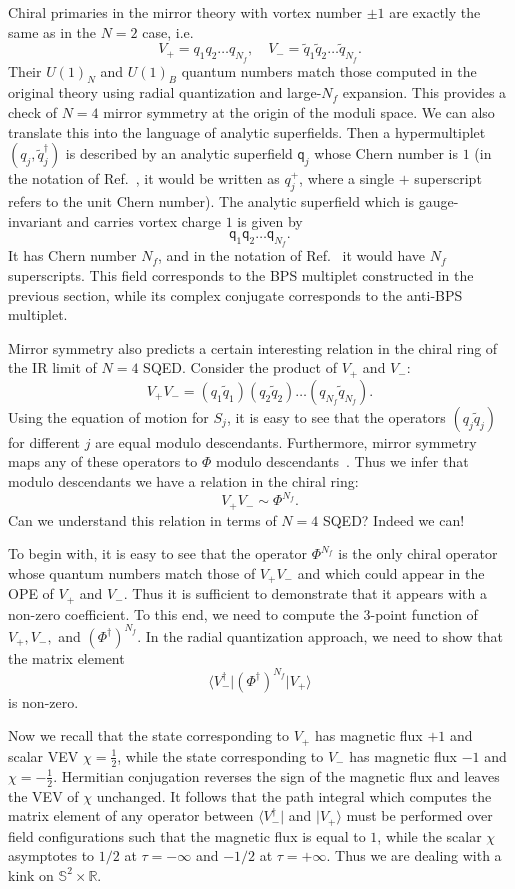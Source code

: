 \documentclass[a4paper,12pt, amsfonts, amssymb]{article}
\newcommand{\RR}{{\mathbb R}}
\renewcommand{\SS}{{\mathbb S}}
\newcommand{\tq}{{\tilde q}}
\newcommand{\q}{{\mathsf q}}
\begin{document}
Chiral primaries in the mirror theory with vortex number $\pm 1$ are 
exactly the same as in the $N=2$ case, i.e.
$$
V_+=q_1 q_2\ldots q_{N_f}, \quad V_-=\tq_1\tq_2\ldots \tq_{N_f}.
$$
Their $U(1)_N$ and $U(1)_B$ quantum numbers match those computed in
the original theory using radial quantization and large-$N_f$ expansion.
This provides a check of $N=4$ mirror symmetry at the origin of the
moduli space. We can also translate this into the language of analytic
superfields. Then a hypermultiplet $(q_j,\tq_j^\dag)$ is described
by an analytic superfield $\q_j$ whose Chern number is $1$ (in the notation
of Ref.~\cite{HS}, it would be written as $q^+_j$, where a single $+$
superscript refers to the unit Chern number). The analytic superfield which
is gauge-invariant and carries vortex charge $1$ is given by
$$
\q_1\q_2\ldots \q_{N_f}.
$$
It has Chern number $N_f$, and in the notation of Ref.~\cite{HS} it
would have $N_f$ superscripts. This field corresponds to the
BPS multiplet constructed in the previous section, while its complex
conjugate corresponds to the anti-BPS multiplet.

Mirror symmetry also predicts a certain interesting relation in the
chiral ring of the IR limit of $N=4$ SQED. 
Consider the product of $V_+$ and $V_-$: 
$$
V_+V_-=(q_1\tq_1)(q_2\tq_2)\ldots (q_{N_f}\tq_{N_f}). 
$$ 
Using the equation of motion for $S_j$, it is easy to see that the 
operators $(q_j \tq_j)$ for different $j$ are equal modulo descendants. Furthermore, mirror symmetry maps any of these operators to $\Phi$ modulo descendants~\cite{five}. Thus we infer that modulo descendants we have a relation in the chiral ring:
\begin{equation}\label{rel}
V_+V_-\sim \Phi^{N_f}.
\end{equation}
Can we understand this relation in terms of $N=4$ SQED? Indeed we can!

To begin with, it is easy to see that the operator $\Phi^{N_f}$ is the
only chiral operator whose quantum numbers match those of $V_+V_-$
and which could appear in the OPE of $V_+$ and $V_-$.
Thus it is sufficient to demonstrate that it appears with a non-zero
coefficient. To this end, we need to compute the 3-point function
of $V_+,V_-,$ and $\left(\Phi^\dag\right)^{N_f}.$ In the radial
quantization approach, we need to show that the matrix element
$$
\langle V_-^\dag \vert \left(\Phi^\dag\right)^{N_f} \vert V_+\rangle
$$
is non-zero.

Now we recall that the state corresponding to $V_+$ has magnetic flux
$+1$ and scalar VEV $\chi=\frac{1}{2}$, while the state corresponding to
$V_-$ has magnetic flux $-1$ and $\chi=-\frac{1}{2}.$
Hermitian conjugation reverses the sign of the magnetic flux and leaves the 
VEV of $\chi$ unchanged. It follows that the path integral which computes
the matrix element of any operator between $\langle V_-^\dag\vert $ and 
$\vert V_+\rangle$ must be performed over field configurations such
that the magnetic flux is equal to $1$, while the scalar $\chi$
asymptotes to $1/2$ at $\tau=-\infty$ and $-1/2$ at $\tau=+\infty.$
Thus we are dealing with a kink on $\SS^2\times\RR$.
\end{document}
